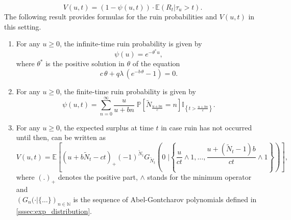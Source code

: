 \[V(u,t)= (1-\psi(u,t))\cdot \mathbb{E}(R_t\vert {\tau_u>t}).\]
 The following result provides formulas for the ruin probabilities and $V(u,t)$ in this setting.
\begin{prop}\label{prop:ruin_proba_and_value_func} 
\text{ }
\begin{enumerate}
\item For any $u\ge 0$, the infinite-time ruin probability is given by
\begin{equation}\label{eq:infinite_time_ruin_proba}
\psi(u) =e^{-\theta^\ast u},
\end{equation}
where $\theta^\ast$ is the positive solution in $\theta$ of the equation 
\begin{equation}\label{eq:cl_equation}
{c}\,\theta + q\lambda \, (e^{-b\, \theta }-1)=0.
\end{equation}
\item For any $u\ge 0$, the finite-time ruin probability is given by 
\begin{equation}\label{eq:finite_time_ruin_proba}
\psi(u,t) = \sum_{n = 0}^{\infty}\frac{u}{u+bn}\;\mathbb{P}\left[\tilde{N}_{\frac{u+bn}{c}} = n\right]\mathbb{I}_{\left\{t>\frac{u+bn}{c}\right\}}. 
\end{equation}
\item For any $u\ge 0$, the expected surplus at time $t$ in case ruin has not occurred until then, can be written as 
\begin{equation}\label{eq:value_function_finite_time_prop}
V(u,t) = \mathbb{E}\left[\left(u+b\tilde{N}_t - ct\right)_+(-1)^{\tilde{N}_t}G_{\tilde{N}_t}\left(0\;\Big\rvert \left\{\frac{u}{ct}\land 1,\ldots, \frac{u+(\tilde{N}_t-1)b}{ct}\land 1\right\}\right) \right],
\end{equation}
where $(.)_+$ denotes the positive part, $\land$ stands for the minimum operator and\\ $\left(G_n(\cdot\rvert\{\ldots\}\right)_{n\in\mathbb{N}}$ is the sequence of Abel-Gontcharov polynomials defined in \cref{sssec:exp_distribution}. 
\end{enumerate}
\end{prop}
